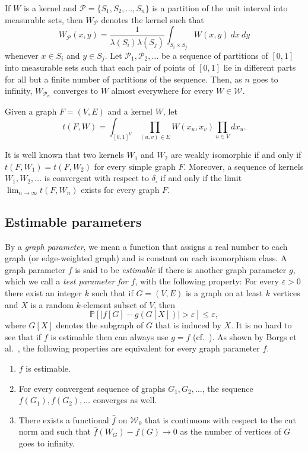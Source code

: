 \documentclass{article}
\begin{document}
If $W$ is a kernel and $\mathcal{P}=\{S_1,S_2,\dots,S_n\}$ is a partition of the unit interval into measurable sets, then $W_\mathcal{P}$ denotes the kernel such that \[W_\mathcal{P}(x,y)=\frac{1}{\lambda(S_i)\lambda(S_j)}\int_{S_i\times S_j}W(x,y)\ dx\ dy\] whenever $x\in S_i$ and $y\in S_j$. Let $\mathcal{P}_1,\mathcal{P}_2,\dots$ be a sequence of partitions of $[0,1]$ into measurable sets such that each pair of points of $[0,1]$ lie in different parts for all but a finite number of partitions of the sequence. Then, as $n$ goes to infinity, $W_{\mathcal{P}_n}$ converges to $W$ almost everywhere for every $W\in\mathcal{W}$.

Given a graph $F=(V,E)$ and a kernel $W$, let \[t(F,W)=\int_{[0,1]^V}\prod_{(u,v)\in E}W(x_u,x_v)\prod_{u\in V}dx_u.\]

It is well known that two kernels $W_1$ and $W_2$ are weakly isomorphic if and only if $t(F,W_1)=t(F,W_2)$ for every simple graph $F$. Moreover, a sequence of kernels $W_1,W_2,\dots$ is convergent with respect to $\delta_\square$ if and only if the limit $\lim_{n\rightarrow\infty}t(F,W_n)$ exists for every graph $F$.


\subsection{Estimable parameters}\label{sec:estimable}

By a \textit{graph parameter}, we mean a function that assigns a real number to each graph (or edge-weighted graph) and is constant on each isomorphism class. A graph parameter $f$ is said to be \textit{estimable} if there is another graph parameter $g$, which we call a \textit{test parameter for $f$}, with the following property: For every $\varepsilon>0$ there exist an integer $k$ such that if $G=(V,E)$ is a graph on at least $k$ vertices and $X$ is a random $k$-element subset of $V$, then \[\mathbb P[|f[G]-g(G[X])|>\varepsilon]\leq\varepsilon,\] where $G[X]$ denotes the subgraph of $G$ that is induced by $X$. It is no hard to see that if $f$ is estimable then can always use $g=f$ (cf.~\cite{goldreichtrevisan,borgslimits}). As shown by Borgs et al.~\cite{borgslimits}, the following properties are equivalent for every graph parameter $f$.

\begin{enumerate}[label=(\alph*)]
    \item $f$ is estimable.
    
    \item For every convergent sequence of graphs $G_1,G_2,\dots$, the sequence $f(G_1),f(G_2),\dots$ converges as well.

    \item There exists a functional $\hat{f}$ on $\mathcal{W}_0$ that is continuous with respect to the cut norm and such that $\hat{f}(W_G)-f(G)\rightarrow 0$ as the number of vertices of $G$ goes to infinity. 
\end{enumerate}
\end{document}
